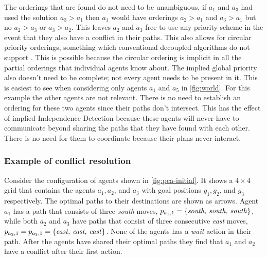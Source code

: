The orderings that are found do not need to be unambiguous, if $a_1$ and $a_3$
had used the solution $a_3 > a_1$ then $a_1$ would have orderings $a_2 > a_1$
and $a_3 > a_1$ but no $a_2 > a_3$ or $a_3 > a_2$. This leaves $a_2$ and $a_3$
free to use any priority scheme in the event that they also have a conflict in
their paths. This also allows for circular priority orderings, something which
conventional decoupled algorithms do not support \cite{bennewitz2002}. This is 
possible because the
circular ordering is implicit in all the partial orderings that individual
agents know about. The implied global priority also doesn't need to be
complete; not every agent needs to be present in it. This is easiest to see
when considering only agents $a_1$ and $a_5$ in \autoref{fig:world}. For this
example the other agents are not relevant. There is no need to establish an
ordering for these two agents since their paths don't intersect. This has the 
effect
of implied Independence Detection \cite{standley2010} because these agents will
never have to communicate beyond sharing the paths that they have found with
each other. There is no need for them to coordinate because their plans never
interact.


\subsubsection{Example of conflict resolution}

Consider the configuration of agents shown in \autoref{fig:pca-initial}. It 
shows a $4 \times 4$ grid that contains the agents $a_1, a_2$, and $a_3$ with 
goal positions $g_1, g_2$, and $g_3$ respectively. The optimal paths to their 
destinations are shown as arrows. Agent $a_1$ has a path that consists of three 
\emph{south} moves, $p_{a_1,1} = \{\text{\emph{south, south, south}}\}$, while 
both $a_2$ and $a_3$ have paths that consist of three consecutive \emph{east} 
moves, $p_{a_2,1} = p_{a_3,1} = \{\text{\emph{east, east, east}}\}$. None of 
the agents has a \emph{wait} action in their path. After the agents have shared 
their optimal paths they find that $a_1$ and $a_2$ have a conflict after their 
first action. 


